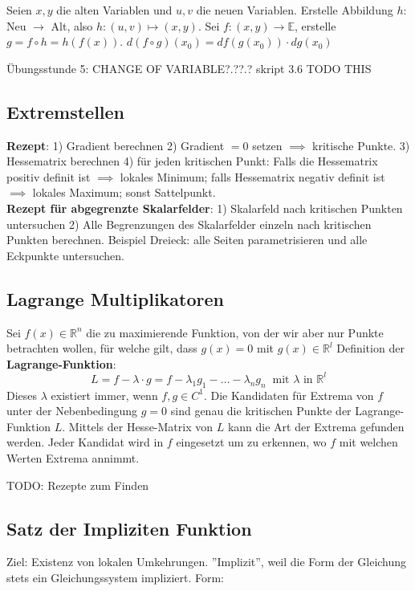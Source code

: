 Seien $x, y$ die alten Variablen und $u, v$ die neuen Variablen. Erstelle Abbildung $h:$ Neu $\to$ Alt, also $h: (u, v) \mapsto (x, y)$. Sei $f: (x, y) \to \mathbb{E}$, erstelle $g = f \circ h = h(f(x))$. $d (f \circ g) (x_0) = df(g(x_0)) \cdot dg(x_0)$

Übungsstunde 5: CHANGE OF VARIABLE?.??.? skript 3.6 TODO THIS

\subsection{Extremstellen}

\textbf{Rezept}: 1) Gradient berechnen 2) Gradient $=0$ setzen $\implies$ kritische Punkte. 3) Hessematrix berechnen 4) für jeden kritischen Punkt: Falls die Hessematrix positiv definit ist $\implies$ lokales Minimum; falls Hessematrix negativ definit ist $\implies$ lokales Maximum; sonst Sattelpunkt.\\

\textbf{Rezept für abgegrenzte Skalarfelder}: 1) Skalarfeld nach kritischen Punkten untersuchen 2) Alle Begrenzungen des Skalarfelder einzeln nach kritischen Punkten berechnen. Beispiel Dreieck: alle Seiten parametrisieren und alle Eckpunkte untersuchen.

\subsection{Lagrange Multiplikatoren}
Sei $f(x) \in \mathbb{R}^{n}$ die zu maximierende Funktion, von der wir aber nur Punkte
betrachten wollen, für welche gilt, dass $g(x) = 0$ mit $g(x) \in \mathbb{R}^{l}$
Definition der \textbf{Lagrange-Funktion}:
\[ L = f-\lambda \cdot g = f - \lambda_{1} g_{1} - \ldots - \lambda_{n}g_{n} ~ \text{ mit $\lambda$ in } \mathbb{R}^{l} \]
Dieses $\lambda$ existiert immer, wenn $f, g \in C^{1}$.
Die Kandidaten für Extrema von $f$ unter der Nebenbedingung $g = 0$ sind genau die
kritischen Punkte der Lagrange-Funktion $L$. Mittels der Hesse-Matrix von $L$
kann die Art der Extrema gefunden werden. Jeder Kandidat wird in $f$ eingesetzt
um zu erkennen, wo $f$ mit welchen Werten Extrema annimmt.

TODO: Rezepte zum Finden

\subsection{Satz der Impliziten Funktion}

Ziel: Existenz von lokalen Umkehrungen. ''Implizit'', weil die Form der Gleichung stets ein Gleichungssystem impliziert. Form:

